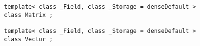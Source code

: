 {
	\small
\begin{lstlisting}
template< class _Field, class _Storage = denseDefault >
class Matrix ;

template< class _Field, class _Storage = denseDefault >
class Vector ;
\end{lstlisting}
}

